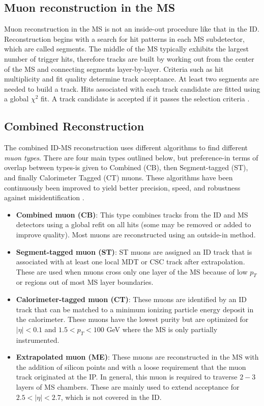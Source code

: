 \subsection{Muon reconstruction in the MS}
Muon reconstruction in the MS is not an inside-out procedure like that in the ID. Reconstruction begins with a search for hit patterns in each MS subdetector, which are called segments. The middle of the MS typically exhibits the largest number of trigger hits, therefore tracks are built by working out from the center of the MS and connecting segments layer-by-layer. Criteria such as hit multiplicity and fit quality determine track acceptance. At least two segments are needed to build a track. Hits associated with each track candidate are fitted using a global $\chi^2$ fit. A track candidate is accepted if it passes the selection criteria \cite{ICreconstruction}. 

\subsection{Combined Reconstruction}
The combined ID-MS reconstruction uses different algorithms to find different \textit{muon types}. There are four main types outlined below, but preference-in terms of overlap between types-is given to Combined (CB), then Segment-tagged (ST), and finally Calorimeter Tagged (CT) muons. These algorithms have been continuously been improved to yield better precision, speed, and robustness against misidentification \cite{MCPpaper}.  

\begin{itemize}
\item \textbf{Combined muon (CB)}: This type combines tracks from the ID and MS detectors using a global refit on all hits (some may be removed or added to improve quality). Most muons are reconstructed using an outside-in method. 
\item \textbf{Segment-tagged muon (ST)}: ST muons are assigned an ID track that is associated with at least one local MDT or CSC track after extrapolation. These are used when muons cross only one layer of the MS because of low $p_T$ or regions out of most MS layer boundaries. 
\item \textbf{Calorimeter-tagged muon (CT)}: These muons are identified by an ID track that can be matched to a minimum ionizing particle energy deposit in the calorimeter. These muons have the lowest purity but are optimized for $|\eta|  < 0.1$ and $1.5 < p_T < 100$ GeV where the MS is only partially instrumented. 
\item \textbf{Extrapolated muon (ME)}: These muons are reconstructed in the MS with the addition of silicon points and with a loose requirement that the muon track originated at the IP. In general, this muon is required to traverse $2-3$ layers of MS chambers. These are mainly used to extend acceptance for $2.5 < |\eta| < 2.7$, which is not covered in the ID. 
\end{itemize}

